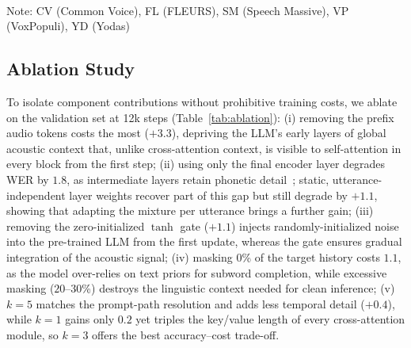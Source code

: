 \documentclass{article}
\begin{document}
\begin{table}[h]
    \centering
    \caption{Impact of proprietary data on Hungarian WER (\%). \textbf{Ours (Full)} uses all data, while \textbf{Ours (Public)} is trained exclusively on public corpora.}
    \label{tab:public_data_ablation}
    \footnotesize
    \\
    \vspace{6pt}
    \raggedright \scriptsize
    Note: CV (Common Voice), FL (FLEURS), SM (Speech Massive), VP (VoxPopuli), YD (Yodas)
\end{table}


\subsection{Ablation Study}
\label{subsec:ablation}
\noindent
To isolate component contributions without prohibitive training costs, we ablate on the validation set at 12k steps (Table~\ref{tab:ablation}):
(i) removing the prefix audio tokens costs the most ($+3.3$), depriving the LLM's early layers of global acoustic context that, unlike cross-attention context, is visible to self-attention in every block from the first step;
(ii) using only the final encoder layer degrades WER by $1.8$, as intermediate layers retain phonetic detail~\cite{yang2021superbspeechprocessinguniversal}; static, utterance-independent layer weights recover part of this gap but still degrade by $+1.1$, showing that adapting the mixture per utterance brings a further gain;
(iii) removing the zero-initialized $\tanh$ gate ($+1.1$) injects randomly-initialized noise into the pre-trained LLM from the first update, whereas the gate ensures gradual integration of the acoustic signal;
(iv) masking 0\% of the target history costs $1.1$, as the model over-relies on text priors for subword completion, while excessive masking ($20$--$30$\%) destroys the linguistic context needed for clean inference;
(v) $k=5$ matches the prompt-path resolution and adds less temporal detail ($+0.4$), while $k=1$ gains only $0.2$ yet triples the key/value length of every cross-attention module, so $k=3$ offers the best accuracy--cost trade-off.
\end{document}
